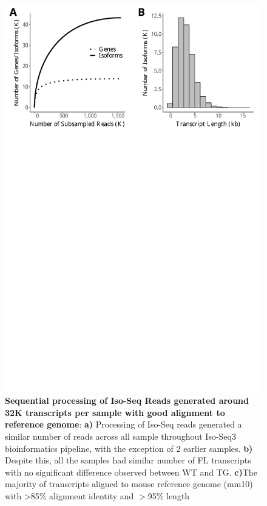 \begin{figure}[htp]
	\begin{center}
		\includegraphics[page=2,scale = 0.55]{Figures/IsoSeqWholeTranscriptome.pdf}
	\end{center}
	\captionsetup{width=0.95\textwidth}
	\caption[Sequential processing and alignment of reads from Whole Transcriptome Iso-Seq run]%
	{\textbf{Sequential processing of Iso-Seq Reads generated around 32K transcripts per sample with good alignment to reference genome}: \textbf{a)} Processing of Iso-Seq reads generated a similar number of reads across all sample throughout Iso-Seq3 bioinformatics pipeline, with the exception of 2 earlier samples. \textbf{b)} Despite this, all the samples had similar number of FL transcripts with no significant difference observed between WT and TG. \textbf{c)}The majority of transcripts aligned to mouse reference genome (mm10) with >85\% alignment identity and $>$95\% length}
	\label{fig:isoseq_whole_processing}
\end{figure}


